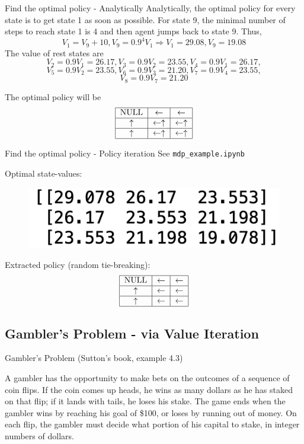 \documentclass{beamer}
\begin{document}
\begin{frame}{Find the optimal policy - Analytically}
Analytically, the optimal policy for every state is to get state 1 as soon as possible. For state 9, the minimal number of steps to reach state 1 is 4 and then agent jumps back to state 9. Thus,
\[
V_1 = V_9 + 10, V_9 = 0.9^4 V_1
\Rightarrow 
V_1 = 29.08, V_9 = 19.08
\]  
The value of rest states are
$$V_2 = 0.9 V_1 = 26.17, V_3 = 0.9 V_2 = 23.55, V_4 = 0.9 V_1 = 26.17,$$
$$V_5 = 0.9 V_2 = 23.55, V_6 = 0.9 V_3 = 21.20, V_7 = 0.9 V_4 = 23.55,$$
$$V_8 = 0.9 V_7 = 21.20$$

The optimal policy will be 
\[
\begin{tabular}{|c|c|c|}
\hline
 NULL & $\leftarrow$ & $\leftarrow$ \\
\hline
 $\uparrow$ & $\leftarrow \uparrow$ & $\leftarrow \uparrow$ \\
\hline 
 $\uparrow$ & $\leftarrow \uparrow$ & $\leftarrow \uparrow$ \\
\hline
\end{tabular}
\]    
\end{frame}

\begin{frame}{Find the optimal policy - Policy iteration}
See \texttt{mdp\_example.ipynb}

Optimal state-values:
\begin{figure}[htpb]
    \centering
    \includegraphics[width=0.5\linewidth]{pic/policy_iter.png}
\end{figure}

Extracted policy (random tie-breaking):
\[
\begin{tabular}{|c|c|c|}
\hline
 NULL & $\leftarrow$ & $\leftarrow$ \\
\hline
 $\uparrow$ & $\leftarrow $ & $\leftarrow $ \\
\hline 
 $\uparrow$ & $\leftarrow $ & $\leftarrow $ \\
\hline
\end{tabular}
\] 
\end{frame}




\subsection{Gambler's Problem - via Value Iteration}
\begin{frame}{Gambler's Problem}
(Sutton's book, example 4.3)

A gambler has the opportunity to make bets on the outcomes of a sequence of coin flips.
If the coin comes up heads, he wins as many dollars as he has staked on that flip; if it lands with tails, he loses his stake. 
The game ends when the gambler wins by reaching his goal of \$100, or loses by running out of money. On each flip, the gambler must decide what portion of his capital to stake, in integer numbers of dollars. 
\end{frame}
\end{document}
